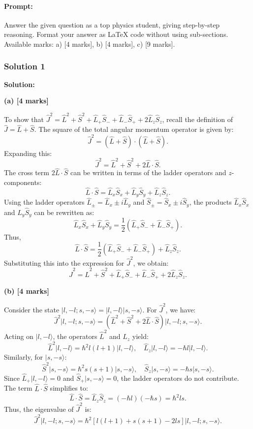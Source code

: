 \documentclass{article}
\begin{document}
\paragraph{Prompt: \\} 
Answer the given question as a top physics student, giving step-by-step reasoning. Format your answer as LaTeX code without using sub-sections. Available marks: a) [4 marks], b) [4 marks], c) [9 marks].


\subsubsection{Solution 1}

\textbf{Solution:}  

\textbf{(a) [4 marks]}  

To show that $\hat{J}^2 = \hat{L}^2 + \hat{S}^2 + \hat{L}_+ \hat{S}_- + \hat{L}_- \hat{S}_+ + 2 \hat{L}_z \hat{S}_z$, recall the definition of $\hat{J} = \hat{L} + \hat{S}$. The square of the total angular momentum operator is given by:  
\[
\hat{J}^2 = (\hat{L} + \hat{S}) \cdot (\hat{L} + \hat{S}).
\]  
Expanding this:  
\[
\hat{J}^2 = \hat{L}^2 + \hat{S}^2 + 2 \hat{L} \cdot \hat{S}.
\]  
The cross term $2 \hat{L} \cdot \hat{S}$ can be written in terms of the ladder operators and $z$-components:  
\[
\hat{L} \cdot \hat{S} = \hat{L}_x \hat{S}_x + \hat{L}_y \hat{S}_y + \hat{L}_z \hat{S}_z.
\]  
Using the ladder operators $\hat{L}_\pm = \hat{L}_x \pm i \hat{L}_y$ and $\hat{S}_\pm = \hat{S}_x \pm i \hat{S}_y$, the products $\hat{L}_x \hat{S}_x$ and $\hat{L}_y \hat{S}_y$ can be rewritten as:  
\[
\hat{L}_x \hat{S}_x + \hat{L}_y \hat{S}_y = \frac{1}{2} \left( \hat{L}_+ \hat{S}_- + \hat{L}_- \hat{S}_+ \right).
\]  
Thus,  
\[
\hat{L} \cdot \hat{S} = \frac{1}{2} \left( \hat{L}_+ \hat{S}_- + \hat{L}_- \hat{S}_+ \right) + \hat{L}_z \hat{S}_z.
\]  
Substituting this into the expression for $\hat{J}^2$, we obtain:  
\[
\hat{J}^2 = \hat{L}^2 + \hat{S}^2 + \hat{L}_+ \hat{S}_- + \hat{L}_- \hat{S}_+ + 2 \hat{L}_z \hat{S}_z.
\]  

\textbf{(b) [4 marks]}  

Consider the state $\lvert l, -l; s, -s \rangle = \lvert l, -l \rangle \lvert s, -s \rangle$. For $\hat{J}^2$, we have:  
\[
\hat{J}^2 \lvert l, -l; s, -s \rangle = (\hat{L}^2 + \hat{S}^2 + 2 \hat{L} \cdot \hat{S}) \lvert l, -l; s, -s \rangle.
\]  
Acting on $\lvert l, -l \rangle$, the operators $\hat{L}^2$ and $\hat{L}_z$ yield:  
\[
\hat{L}^2 \lvert l, -l \rangle = \hbar^2 l(l+1) \lvert l, -l \rangle, \quad \hat{L}_z \lvert l, -l \rangle = -\hbar l \lvert l, -l \rangle.
\]  
Similarly, for $\lvert s, -s \rangle$:  
\[
\hat{S}^2 \lvert s, -s \rangle = \hbar^2 s(s+1) \lvert s, -s \rangle, \quad \hat{S}_z \lvert s, -s \rangle = -\hbar s \lvert s, -s \rangle.
\]  
Since $\hat{L}_+ \lvert l, -l \rangle = 0$ and $\hat{S}_+ \lvert s, -s \rangle = 0$, the ladder operators do not contribute. The term $\hat{L} \cdot \hat{S}$ simplifies to:  
\[
\hat{L} \cdot \hat{S} = \hat{L}_z \hat{S}_z = (-\hbar l)(-\hbar s) = \hbar^2 ls.
\]  
Thus, the eigenvalue of $\hat{J}^2$ is:  
\[
\hat{J}^2 \lvert l, -l; s, -s \rangle = \hbar^2 \left[ l(l+1) + s(s+1) - 2ls \right] \lvert l, -l; s, -s \rangle.
\]  
\end{document}
